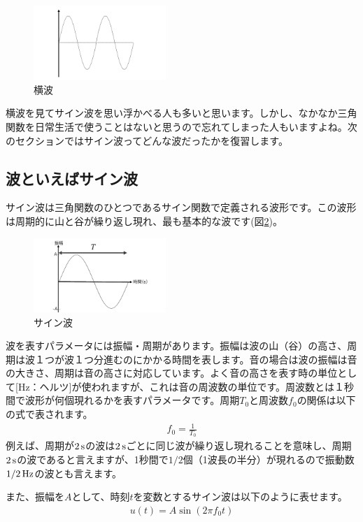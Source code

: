 \documentclass[11pt,b5paper,papersize,dvipdfmx]{jsbook}
\begin{document}
\begin{figure}[H]
  \centering
  \includegraphics[width=5cm]{nsmr/img/slide16.png}
  \caption{横波}
  \label{fig:yokonami}
\end{figure}
横波を見てサイン波を思い浮かべる人も多いと思います。しかし、なかなか三角関数を日常生活で使うことはないと思うので忘れてしまった人もいますよね。次のセクションではサイン波ってどんな波だったかを復習します。



\subsection{波といえばサイン波}
サイン波は三角関数のひとつであるサイン関数で定義される波形です。この波形は周期的に山と谷が繰り返し現れ、最も基本的な波です(図\ref{fig:sinha})。
\begin{figure}[H]
  \centering
  \includegraphics[width=5cm]{nsmr/img/slide15}
  \caption{サイン波}
  \label{fig:sinha}
\end{figure}
波を表すパラメータには振幅・周期があります。振幅は波の山（谷）の高さ、周期は波１つが波１つ分進むのにかかる時間を表します。音の場合は波の振幅は音の大きさ、周期は音の高さに対応しています。よく音の高さを表す時の単位として[Hz：ヘルツ]が使われますが、これは音の周波数の単位です。周波数とは１秒間で波形が何個現れるかを表すパラメータです。周期$T_0$と周波数$f_0$の関係は以下の式で表されます。
\begin{align}
  f_0=\frac{1}{T_0}
\end{align}
例えば、周期が$2\tani{s}$の波は$2\tani{s}$ごとに同じ波が繰り返し現れることを意味し、周期$2\tani{s}$の波であると言えますが、1秒間で$1/2$個（1波長の半分）が現れるので振動数$1/2\tani{Hz}$の波とも言えます。\par
また、振幅を$A$として、時刻$t$を変数とするサイン波は以下のように表せます。
\begin{align}
  u(t)=A\sin{(2\pi f_0 t)}
\end{align}
\end{document}
